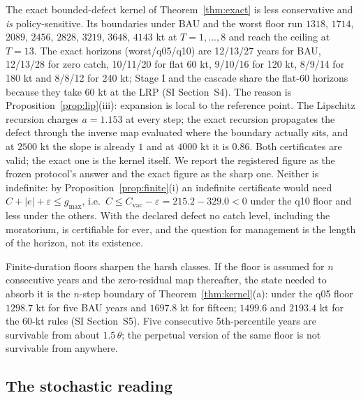 \documentclass[11pt,a4paper]{article}
\theoremstyle{plain}
\theoremstyle{definition}
\theoremstyle{remark}
\newcommand{\LRP}{\theta}
\newcommand{\Cvac}{C_{\mathrm{vac}}}
\newcommand{\gmax}{g_{\max}}
\begin{document}
The exact bounded-defect kernel of Theorem~\ref{thm:exact} is less conservative and \emph{is} policy-sensitive. Its boundaries under BAU and the worst floor run $1318$, $1714$, $2089$, $2456$, $2828$, $3219$, $3648$, $4143$ kt at $T=1,\dots,8$ and reach the ceiling at $T=13$. The exact horizons (worst/q05/q10) are 12/13/27 years for BAU, 12/13/28 for zero catch, 10/11/20 for flat 60 kt, 9/10/16 for 120 kt, 8/9/14 for 180 kt and 8/8/12 for 240 kt; Stage I and the cascade share the flat-60 horizons because they take 60 kt at the LRP (SI Section~S4). The reason is Proposition~\ref{prop:lip}(iii): expansion is local to the reference point. The Lipschitz recursion charges $a=1.153$ at every step; the exact recursion propagates the defect through the inverse map evaluated where the boundary actually sits, and at $2500$ kt the slope is already $1$ and at $4000$ kt it is $0.86$. Both certificates are valid; the exact one is the kernel itself. We report the registered figure as the frozen protocol's answer and the exact figure as the sharp one. Neither is indefinite: by Proposition~\ref{prop:finite}(i) an indefinite certificate would need $C+|e|+\varepsilon\le\gmax$, i.e.\ $C\le\Cvac-\varepsilon=215.2-329.0<0$ under the q10 floor and less under the others. With the declared defect no catch level, including the moratorium, is certifiable for ever, and the question for management is the length of the horizon, not its existence.

Finite-duration floors sharpen the harsh classes. If the floor is assumed for $n$ consecutive years and the zero-residual map thereafter, the state needed to absorb it is the $n$-step boundary of Theorem~\ref{thm:kernel}(a): under the q05 floor $1298.7$ kt for five BAU years and $1697.8$ kt for fifteen; $1499.6$ and $2193.4$ kt for the 60-kt rules (SI Section~S5). Five consecutive 5th-percentile years are survivable from about $1.5\,\LRP$; the perpetual version of the same floor is not survivable from anywhere.

\subsection{The stochastic reading}\label{sec:cod-stoch}
\end{document}
